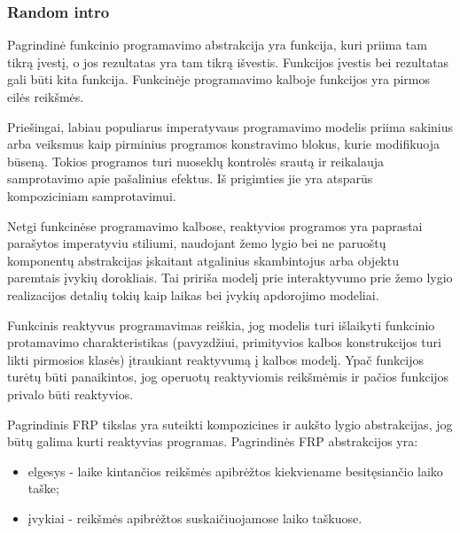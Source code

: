 
\subsubsection{Random intro}

Pagrindinė funkcinio programavimo abstrakcija yra funkcija, kuri priima tam tikrą įvestį, o jos rezultatas yra tam tikrą išvestis. Funkcijos įvestis bei rezultatas gali būti kita funkcija. Funkcinėje programavimo kalboje funkcijos yra pirmos eilės reikšmės.

Priešingai, labiau populiarus imperatyvaus programavimo modelis priima sakinius arba veiksmus kaip pirminius programos konstravimo blokus, kurie modifikuoja būseną. Tokios programos turi nuoseklų kontrolės srautą ir reikalauja samprotavimo apie pašalinius efektus. Iš prigimties jie yra atsparūs kompoziciniam samprotavimui.

Netgi funkcinėse programavimo kalbose, reaktyvios programos yra paprastai parašytos imperatyviu stiliumi, naudojant žemo lygio bei ne paruoštų komponentų abstrakcijas įskaitant atgalinius skambintojus arba objektu paremtais įvykių dorokliais. Tai pririša modelį prie interaktyvumo prie žemo lygio realizacijos detalių tokių kaip laikas bei įvykių apdorojimo modeliai.

Funkcinis reaktyvus programavimas reiškia, jog modelis turi išlaikyti funkcinio protamavimo charakteristikas (pavyzdžiui, primityvios kalbos konstrukcijos turi likti pirmosios klasės) įtraukiant reaktyvumą į kalbos modelį. Ypač funkcijos turėtų būti panaikintos, jog operuotų reaktyviomis reikšmėmis ir pačios funkcijos privalo būti reaktyvios.

Pagrindinis FRP tikslas yra suteikti kompozicines ir aukšto lygio abstrakcijas, jog būtų galima kurti reaktyvias programas. 
Pagrindinės FRP abstrakcijos yra:

\begin{itemize}

	\item elgesys - laike kintančios reikšmės apibrėžtos kiekviename besitęsiančio laiko taške;

	\item įvykiai - reikšmės apibrėžtos suskaičiuojamose laiko taškuose.

\end{itemize}

